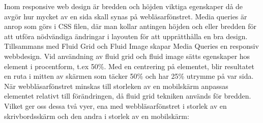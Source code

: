 \documentclass[11pt]{article}
\begin{document}
Inom responsive web design är bredden och höjden viktiga egenskaper då de avgör hur mycket av en sida skall synas på webläsarfönstret.  Media queries är anrop som görs i CSS filen, där man kollar antingen höjden och eller bredden för att utföra nödvändiga ändringar i layouten för att upprätthålla en bra design. Tillsammans med Fluid Grid och Fluid Image skapar Media Queries en responsiv webbdesign. 
\newpage
Vid användning av fluid grid och fluid image sätts egenskaper hos element i procentform, t.ex 50\%. Med en centrering på elementet, blir resultatet en ruta i mitten av skärmen som täcker 50\% och har 25\% utrymme på var sida. När webbläsarfönstret minskas till storleken av en mobilskärm anpassas elementet relativt till förändringen, då fluid grid tekniken används för bredden. Vilket ger oss dessa två vyer, ena med webbläsarfönstret i storlek av en skrivbordsskärm och den andra i storlek av en mobilskärm:
\end{document}
